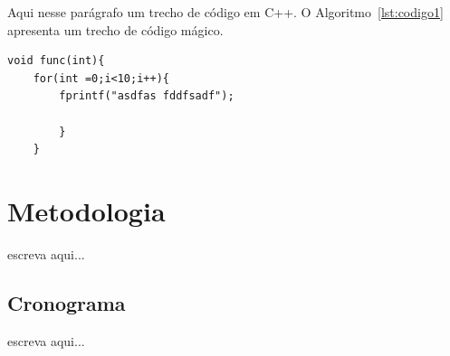 Aqui nesse parágrafo um trecho de código em C++. O Algoritmo~\ref{lst:codigo1} apresenta um trecho de código mágico.

\begin{lstlisting}[caption={Exemplo de laço},label={lst:codigo1}]
	void func(int){
	for(int =0;i<10;i++){
		fprintf("asdfas fddfsadf");
	
		}
	}
\end{lstlisting}



\section{Metodologia}
escreva aqui...

\subsection{Cronograma}
escreva aqui...

